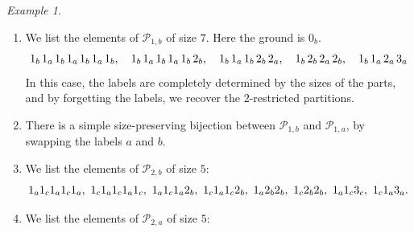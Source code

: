 \documentclass[11pt]{article}
\theoremstyle{definition}
\theoremstyle{remark}
\newtheorem{example}[theorem]{Example}
\theoremstyle{definition}
\numberwithin{equation}{section}
\begin{document}
\vspace{1em}
\begin{example}\label{ex:grounded_partitions}
\begin{enumerate}[
  label=(\roman*),
  leftmargin=0pt,
  labelwidth=1.4em,   %
  labelsep=0.3em,     %
  itemindent=!,
  align=left,
  itemsep=0pt
]
\item We list the elements of $\mathcal{P}_{1,b}$ of size $7$. Here the ground is $0_b$.
  \begin{align*}
    \textcolor{black}{1_b} \, \textcolor{black}{1_a} \, \textcolor{black}{1_b} \, \textcolor{black}{1_a} \, \textcolor{black}{1_b} \, \textcolor{black}{1_a} \, \textcolor{black}{1_b},\quad
    \textcolor{black}{1_b} \, \textcolor{black}{1_a} \, \textcolor{black}{1_b} \, \textcolor{black}{1_a} \, \textcolor{black}{1_b} \, \textcolor{black}{2_b},\quad
    \textcolor{black}{1_b} \, \textcolor{black}{1_a} \, \textcolor{black}{1_b} \, \textcolor{black}{2_b} \, \textcolor{black}{2_a},\quad \textcolor{black}{1_b} \, \textcolor{black}{2_b} \, \textcolor{black}{2_a} \, \textcolor{black}{2_b},\quad
    \textcolor{black}{1_b} \, \textcolor{black}{1_a} \, \textcolor{black}{2_a} \, \textcolor{black}{3_a}
  \end{align*}
  In this case, the labels are completely determined by the sizes of
  the parts, and by forgetting the labels, we recover the $2$-restricted partitions.
\item There is a simple size-preserving bijection between $\mathcal{P}_{1,b}$ and $\mathcal{P}_{1,a}$, by swapping the labels $a$ and $b$.
\item We list the elements of $\mathcal{P}_{2,b}$ of size \( 5 \):
\begin{align*}
\textcolor{black}{1_a} \textcolor{black}{1_c} \textcolor{black}{1_a} \textcolor{black}{1_c} \textcolor{black}{1_a},\ \textcolor{black}{1_c} \textcolor{black}{1_a} \textcolor{black}{1_c} \textcolor{black}{1_a} \textcolor{black}{1_c},\ \textcolor{black}{1_a} \textcolor{black}{1_c} \textcolor{black}{1_a} \textcolor{black}{2_b},\ \textcolor{black}{1_c} \textcolor{black}{1_a} \textcolor{black}{1_c} \textcolor{black}{2_b},\ \textcolor{black}{1_a} \textcolor{black}{2_b} \textcolor{black}{2_b},\ \textcolor{black}{1_c} \textcolor{black}{2_b} \textcolor{black}{2_b},\ \textcolor{black}{1_a} \textcolor{black}{1_c} \textcolor{black}{3_c},\ \textcolor{black}{1_c} \textcolor{black}{1_a} \textcolor{black}{3_a}.
\end{align*}
\item We list the elements of $\mathcal{P}_{2,a}$ of size \( 5 \):

\end{enumerate}
\end{example}
\end{document}
